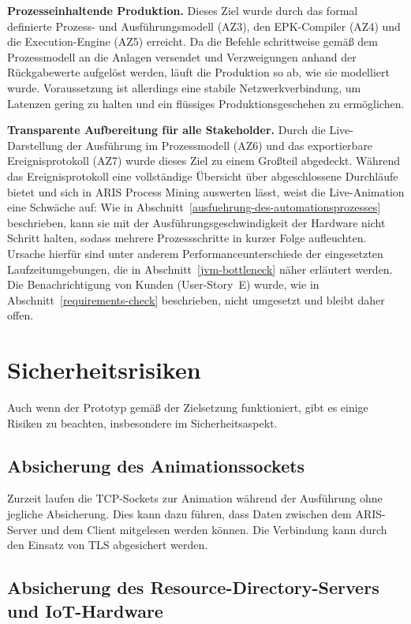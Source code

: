 \noindent \textbf{Prozesseinhaltende Produktion.} 
Dieses Ziel wurde durch das formal definierte Prozess- und Ausführungsmodell (AZ3), den 
EPK-Compiler (AZ4) und die Execution-Engine (AZ5) erreicht. Da die Befehle schrittweise 
gemäß dem Prozessmodell an die Anlagen versendet und Verzweigungen anhand der 
Rückgabewerte aufgelöst werden, läuft die Produktion so ab, wie sie modelliert wurde. 
Voraussetzung ist allerdings eine stabile Netzwerkverbindung, um Latenzen gering zu 
halten und ein flüssiges Produktionsgeschehen zu ermöglichen.

\noindent \textbf{Transparente Aufbereitung für alle Stakeholder.} 
Durch die Live-Darstellung der Ausführung im Prozessmodell (AZ6) und das exportierbare 
Ereignisprotokoll (AZ7) wurde dieses Ziel zu einem Großteil abgedeckt. Während das 
Ereignisprotokoll eine vollständige Übersicht über abgeschlossene Durchläufe bietet und 
sich in ARIS Process Mining auswerten lässt, weist die Live-Animation eine Schwäche auf: 
Wie in Abschnitt~\ref{ausfuehrung-des-automationsprozesses} beschrieben, kann sie mit der 
Ausführungsgeschwindigkeit der Hardware nicht Schritt halten, sodass mehrere 
Prozessschritte in kurzer Folge aufleuchten. Ursache hierfür sind unter anderem 
Performanceunterschiede der eingesetzten Laufzeitumgebungen, die in 
Abschnitt~\ref{jvm-bottleneck} näher erläutert werden. Die Benachrichtigung von Kunden 
(User-Story~E) wurde, wie in Abschnitt~\ref{requirements-check} beschrieben, nicht 
umgesetzt und bleibt daher offen.

\section{Sicherheitsrisiken}

Auch wenn der Prototyp gemäß der Zielsetzung funktioniert, gibt es einige Risiken zu beachten, insbesondere im Sicherheitsaspekt.

\subsection{Absicherung des Animationssockets}

Zurzeit laufen die TCP-Sockets zur Animation während der Ausführung ohne jegliche Absicherung. Dies kann dazu 
führen, dass Daten zwischen dem ARIS-Server und dem Client mitgelesen werden können. Die Verbindung kann durch den Einsatz von \ac{TLS}
abgesichert werden. \cite{wendzel_it-sicherheit_2018}

\subsection{Absicherung des Resource-Directory-Servers und IoT-Hardware}


